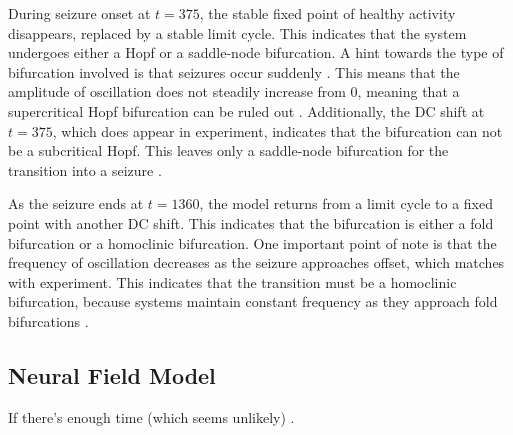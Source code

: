 During seizure onset at $t = 375$, the stable fixed point of healthy activity disappears, replaced by a stable limit cycle.
This indicates that the system undergoes either a Hopf or a saddle-node bifurcation.
A hint towards the type of bifurcation involved is that seizures occur suddenly \cite{Kandel2013}.
This means that the amplitude of oscillation does not steadily increase from 0, meaning that a supercritical Hopf bifurcation can be ruled out \cite{Strogatz2015}.
Additionally, the DC shift at $t = 375$, which does appear in experiment, indicates that the bifurcation can not be a subcritical Hopf.
This leaves only a saddle-node bifurcation for the transition into a seizure \cite{Jirsa2014}.

As the seizure ends at $t = 1360$, the model returns from a limit cycle to a fixed point with another DC shift.
This indicates that the bifurcation is either a fold bifurcation or a homoclinic bifurcation.
One important point of note is that the frequency of oscillation decreases as the seizure approaches offset, which matches with experiment.
This indicates that the transition must be a homoclinic bifurcation, because systems maintain constant frequency as they approach fold bifurcations \cite{Jirsa2014}.


\subsection{Neural Field Model}
\label{sec:lit_review_bifurcation_field}
If there's enough time (which seems unlikely) \cite{Breakspear2005}.


